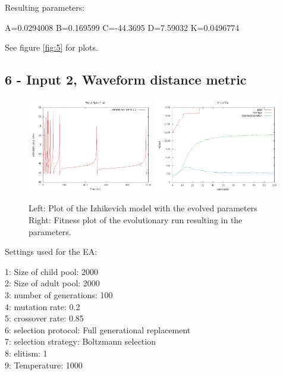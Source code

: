 \documentclass[11pt]{article}
\begin{document}
Resulting parameters:

A=0.0294008 B=0.169599 C=-44.3695 D=7.59032 K=0.0496774

See figure \ref{fig:5} for plots.

\subsection*{6 - Input 2, Waveform distance metric}

\begin{figure}
\begin{center}
\mbox{\includegraphics[width=0.49\textwidth]{images/6-res.png}}
\mbox{\includegraphics[width=0.49\textwidth]{images/6-fit.png}}
\end{center}
\caption{Left: Plot of the Izhikevich model with the evolved parameters\\
Right: Fitness plot of the evolutionary run resulting in the parameters.}
\label{fig:6}
\end{figure}

Settings used for the EA:

1: Size of child pool: 2000\\
2: Size of adult pool: 2000\\
3: number of generations: 100\\
4: mutation rate: 0.2\\
5: crossover rate: 0.85\\
6: selection protocol: Full generational replacement\\
7: selection strategy: Boltzmann selection\\
8: elitism: 1\\
9: Temperature: 1000\\
\end{document}
